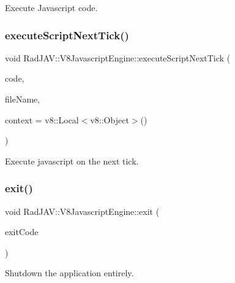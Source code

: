 Execute Javascript code. 

\mbox{\label{class_rad_j_a_v_1_1_v8_javascript_engine_ad3054e8230802a30234d00f1df067701}} 
\subsubsection{\texorpdfstring{execute\+Script\+Next\+Tick()}{executeScriptNextTick()}}
{\footnotesize\ttfamily void Rad\+J\+A\+V\+::\+V8\+Javascript\+Engine\+::execute\+Script\+Next\+Tick (\begin{DoxyParamCaption}\item[{\mbox{\hyperlink{class_rad_j_a_v_1_1_string}{String}}}]{code,  }\item[{\mbox{\hyperlink{class_rad_j_a_v_1_1_string}{String}}}]{file\+Name,  }\item[{v8\+::\+Local$<$ v8\+::\+Object $>$}]{context = {\ttfamily v8\+:\+:Local$<$v8\+:\+:Object$>$()} }\end{DoxyParamCaption})}



Execute javascript on the next tick. 

\mbox{\label{class_rad_j_a_v_1_1_v8_javascript_engine_a23fcc70cb6805867951748fd1c9706f1}} 
\subsubsection{\texorpdfstring{exit()}{exit()}}
{\footnotesize\ttfamily void Rad\+J\+A\+V\+::\+V8\+Javascript\+Engine\+::exit (\begin{DoxyParamCaption}\item[{R\+J\+I\+NT}]{exit\+Code }\end{DoxyParamCaption})\hspace{0.3cm}{\ttfamily [virtual]}}



Shutdown the application entirely. 




